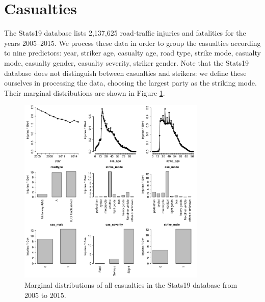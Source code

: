 \documentclass{article}
\begin{document}


\section{Casualties}\label{injuries}

The Stats19 database lists 2,137,625 road-traffic injuries and fatalities for the years 2005--2015. We process these data in order to group the casualties according to nine predictors: year, striker age, casualty age, road type, strike mode, casualty mode, casualty gender, casualty severity, striker gender. Note that the Stats19 database does not distinguish between casualties and strikers: we define these ourselves in processing the data, choosing the largest party as the striking mode. Their marginal distributions are shown in Figure \ref{descriptive}.

\begin{figure}[H]
\centering
\includegraphics[width=0.8\textwidth]{descriptive.pdf}
\caption{\small Marginal distributions of all casualties in the Stats19 database from 2005 to 2015.}
\label{descriptive}
\end{figure}
\end{document}

